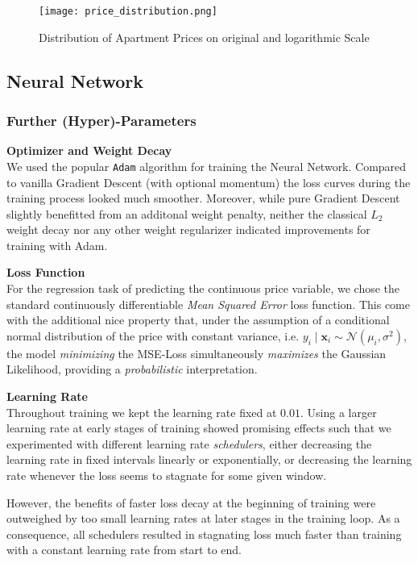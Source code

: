 \begin{figure}[ht]
    \centering
    \texttt{[image: price\_distribution.png]}
    \caption{Distribution of Apartment Prices on original and logarithmic Scale}
    \label{fig:price-distribution}
\end{figure}


\subsection{Neural Network}

\subsubsection{Further (Hyper)-Parameters} \label{appendix:hyperparameters}

\textbf{Optimizer and Weight Decay} \\
We used the popular \texttt{Adam} algorithm \citep{kingma2017} for training the Neural Network.
Compared to vanilla Gradient Descent (with optional momentum) the loss curves during the training process looked much smoother.
Moreover, while pure Gradient Descent slightly benefitted from an additonal weight penalty, neither the classical $L_2$ weight decay nor any other weight regularizer indicated improvements for training with Adam.

\textbf{Loss Function} \\
For the regression task of predicting the continuous price variable, we chose the standard continuously differentiable \emph{Mean Squared Error} loss function.
This come with the additional nice property that, under the assumption of a conditional normal distribution of the price with constant variance, i.e. $y_i \mid \mathbf{x}_i \sim \mathcal{N} \left(\mu_i, \sigma^2 \right)$, the model \emph{minimizing} the MSE-Loss simultaneously \emph{maximizes} the Gaussian Likelihood, providing a \emph{probabilistic} interpretation.

\textbf{Learning Rate} \\
Throughout training we kept the learning rate fixed at $0.01$.
Using a larger learning rate at early stages of training showed promising effects such that we experimented with different learning rate \emph{schedulers}, either decreasing the learning rate in fixed intervals linearly or exponentially, or decreasing the learning rate whenever the loss seems to stagnate for some given window.

However, the benefits of faster loss decay at the beginning of training were outweighed by too small learning rates at later stages in the training loop.
As a consequence, all schedulers resulted in stagnating loss much faster than training with a constant learning rate from start to end.

